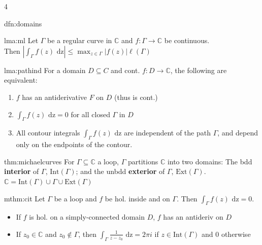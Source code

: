 \documentclass[landscape, 8pt]{extarticle}
\begin{document}
\begin{multicols*}{4}
\begin{dfn}[Domains]{dfn:domains}{ }
		
	\end{dfn}
	
	
	\begin{lma}{lma:ml}{ }
		Let $\Gamma$ be a regular curve in $\mathbb{C}$ and $f: \Gamma \to \mathbb{C}$ be continuous.\\
		Then $\left|\int_{\Gamma}f(z) \text{ dz}\right| \le \max_{z \in \Gamma}\left|f(z)\right| \ell(\Gamma)$
		
	\end{lma}
	
	
	\begin{lma}{lma:pathind}{ }
		For a domain $D \subseteq C$ and cont. $f: D \to \mathbb{C}$, the following are equivalent:
		\begin{enumerate}[label = (\roman*)]
			\item $f$ has an antiderivative $F$ on $D$ (thus is cont.)
			\item $\int_{\Gamma} f(z) \text{ dz} = 0$ for all closed $\Gamma$ in $D$
			\item All contour integrals $\int_\Gamma f(z) \text{ dz}$ are independent of the path $\Gamma$, and depend only on the endpoints of the contour.
		\end{enumerate}
		
	\end{lma}
	
	
	\begin{thm}{thm:michaelcurves}{ }
		For $\Gamma \subseteq \mathbb{C}$ a loop, $\Gamma$ partitions $\mathbb{C}$ into two domains: The bdd \textbf{interior} of $\Gamma$, $\text{Int}(\Gamma)$; and the unbdd \textbf{exterior} of $\Gamma$, $\text{Ext}(\Gamma)$. $\mathbb{C} = \text{Int}(\Gamma) \cup \Gamma \cup \text{Ext}(\Gamma)$
		
	\end{thm}
	
	
	\begin{mthm}{mthm:cit}{ }
		Let $\Gamma$ be a loop and $f$ be hol. inside and on $\Gamma$. Then 
		$
		\int_{\Gamma}f(z) \text{ dz} = 0.
		$
		\begin{itemize}
			\item If $f$ is hol. on a simply-connected domain $D$, $f$ has an antideriv on $D$
			\item If $z_0 \in \mathbb{C}$ and $z_0 \notin \Gamma$, then $\int_{\Gamma} \frac{1}{z - z_0} \text{ dz} = 2\pi i$ if $z \in \text{Int}(\Gamma)$ and 0 otherwise
		\end{itemize}
	\end{mthm}
	

\end{multicols*}
\end{document}
